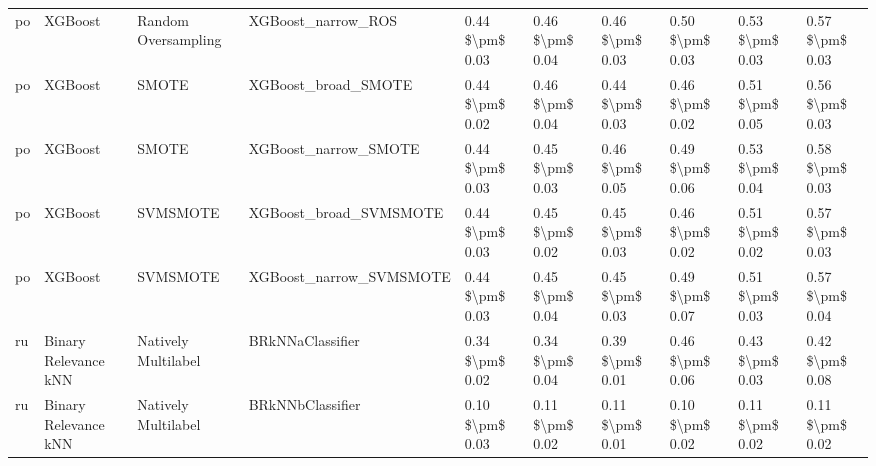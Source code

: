 \begin{tabular}{llllllllll}
      po &                         XGBoost &           Random Oversampling &                           XGBoost\_narrow\_ROS & 0.44 \$\textbackslash pm\$ 0.03 &           0.46 \$\textbackslash pm\$ 0.04 &       0.46 \$\textbackslash pm\$ 0.03 &        0.50 \$\textbackslash pm\$ 0.03 &                         0.53 \$\textbackslash pm\$ 0.03 &     0.57 \$\textbackslash pm\$ 0.03 \\
      po &                         XGBoost &                         SMOTE &                          XGBoost\_broad\_SMOTE & 0.44 \$\textbackslash pm\$ 0.02 &           0.46 \$\textbackslash pm\$ 0.04 &       0.44 \$\textbackslash pm\$ 0.03 &        0.46 \$\textbackslash pm\$ 0.02 &                         0.51 \$\textbackslash pm\$ 0.05 &     0.56 \$\textbackslash pm\$ 0.03 \\
      po &                         XGBoost &                         SMOTE &                         XGBoost\_narrow\_SMOTE & 0.44 \$\textbackslash pm\$ 0.03 &           0.45 \$\textbackslash pm\$ 0.03 &       0.46 \$\textbackslash pm\$ 0.05 &        0.49 \$\textbackslash pm\$ 0.06 &                         0.53 \$\textbackslash pm\$ 0.04 &     0.58 \$\textbackslash pm\$ 0.03 \\
      po &                         XGBoost &                      SVMSMOTE &                       XGBoost\_broad\_SVMSMOTE & 0.44 \$\textbackslash pm\$ 0.03 &           0.45 \$\textbackslash pm\$ 0.02 &       0.45 \$\textbackslash pm\$ 0.03 &        0.46 \$\textbackslash pm\$ 0.02 &                         0.51 \$\textbackslash pm\$ 0.02 &     0.57 \$\textbackslash pm\$ 0.03 \\
      po &                         XGBoost &                      SVMSMOTE &                      XGBoost\_narrow\_SVMSMOTE & 0.44 \$\textbackslash pm\$ 0.03 &           0.45 \$\textbackslash pm\$ 0.04 &       0.45 \$\textbackslash pm\$ 0.03 &        0.49 \$\textbackslash pm\$ 0.07 &                         0.51 \$\textbackslash pm\$ 0.03 &     0.57 \$\textbackslash pm\$ 0.04 \\
      ru &            Binary Relevance kNN &           Natively Multilabel &                             BRkNNaClassifier & 0.34 \$\textbackslash pm\$ 0.02 &           0.34 \$\textbackslash pm\$ 0.04 &       0.39 \$\textbackslash pm\$ 0.01 &        0.46 \$\textbackslash pm\$ 0.06 &                         0.43 \$\textbackslash pm\$ 0.03 &     0.42 \$\textbackslash pm\$ 0.08 \\
      ru &            Binary Relevance kNN &           Natively Multilabel &                             BRkNNbClassifier & 0.10 \$\textbackslash pm\$ 0.03 &           0.11 \$\textbackslash pm\$ 0.02 &       0.11 \$\textbackslash pm\$ 0.01 &        0.10 \$\textbackslash pm\$ 0.02 &                         0.11 \$\textbackslash pm\$ 0.02 &     0.11 \$\textbackslash pm\$ 0.02 \\

\end{tabular}

